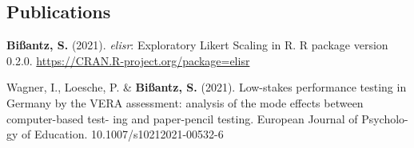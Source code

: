 \documentclass[10pt]{FreemanCV}
\begin{document}
\begin{paracol}{2}


	
	
	
	
	
	


\section{Publications}


\textbf{Bißantz, S.} (2021). \textit{elisr}: Exploratory Likert Scaling in R.
R package version 0.2.0. \href{https://CRAN.R-project.org/package=elisr}{https://CRAN.R-project.org/pa\-ckage=elisr}

\medskip %

Wagner, I., Loesche, P. \& \textbf{Bißantz, S.} (2021). Low-stakes
performance testing in Germany by the VERA assessment:
analysis of the mode effects between computer-based test-
ing and paper-pencil testing. European Journal of Psycholo-
gy of Education. 10.1007/s10212021-00532-6



\end{paracol}
\end{document}
